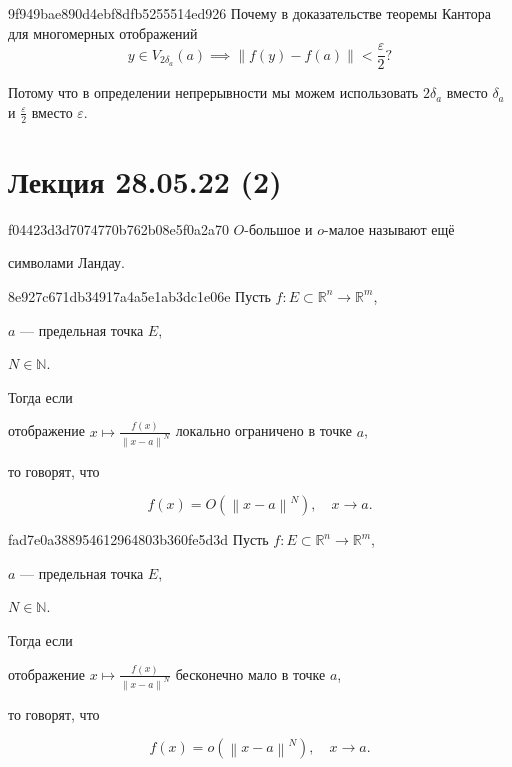 \begin{note}{9f949bae890d4ebf8dfb5255514ed926}
    Почему в доказательстве теоремы Кантора для многомерных отображений
    \[
        y \in V_{2\delta_a}(a) \implies \left\lVert f(y) - f(a) \right\rVert < \frac{\varepsilon}{2}?
    \]

    \begin{cloze}{1}
        Потому что в определении непрерывности мы можем использовать \({ 2\delta_a }\) вместо \({ \delta_a }\) и \({ \frac{\varepsilon}{2} }\) вместо \({ \varepsilon }\).
    \end{cloze}
\end{note}

\section{Лекция 28.05.22 (2)}
\begin{note}{f04423d3d7074770b762b08e5f0a2a70}
    \({ O }\)-большое и \({ o }\)-малое называют ещё \begin{icloze}{1}символами Ландау.\end{icloze}
\end{note}

\begin{note}{8e927c671db34917a4a5e1ab3dc1e06e}
    Пусть \({ f : E \subset \mathbb R^{n} \to \mathbb R^{m} }\), \begin{icloze}{3}\({ a }\) --- предельная точка \({ E }\),\end{icloze}\: \begin{icloze}{4}\({ N \in \mathbb N }\).\end{icloze}
    Тогда если \begin{icloze}{2}отображение \({ x \mapsto \frac{f(x)}{\left\lVert x - a \right\rVert^{N}} }\) локально ограничено в точке \({ a }\),\end{icloze} то говорят, что
    \begin{icloze}{1}
        \[
            f(x) = O(\left\lVert x - a \right\rVert^{N}), \quad  x \to a.
        \]
    \end{icloze}
\end{note}

\begin{note}{fad7e0a388954612964803b360fe5d3d}
    Пусть \({ f : E \subset \mathbb R^{n} \to \mathbb R^{m} }\), \begin{icloze}{3}\({ a }\) --- предельная точка \({ E }\),\end{icloze}\: \begin{icloze}{4}\({ N \in \mathbb N }\).\end{icloze}
    Тогда если \begin{icloze}{2}отображение \({ x \mapsto \frac{f(x)}{\left\lVert x - a \right\rVert^{N}} }\) бесконечно мало в точке \({ a }\),\end{icloze} то говорят, что
    \begin{icloze}{1}
        \[
            f(x) = o(\left\lVert x - a \right\rVert^{N}), \quad x \to a.
        \]
    \end{icloze}
\end{note}

